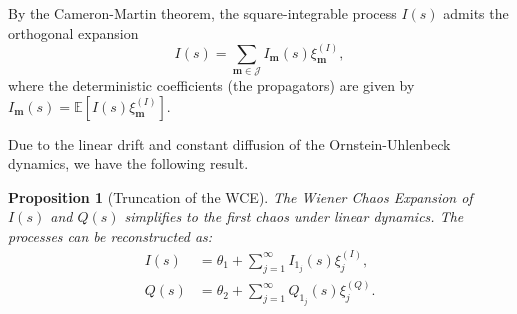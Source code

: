 \documentclass[11pt]{article}
\newtheorem{proposition}{Proposition}
\begin{document}
By the Cameron-Martin theorem, the square-integrable process $I(s)$ admits the orthogonal expansion 
$$
I(s) = \sum_{\mathbf{m} \in \mathcal{J}} I_{\mathbf{m}}(s) \xi_{\mathbf{m}}^{(I)},
$$
where the deterministic coefficients (the propagators) are given by $I_{\mathbf{m}}(s) = \mathbb{E}[I(s)\xi_{\mathbf{m}}^{(I)}]$.

Due to the linear drift and constant diffusion of the Ornstein-Uhlenbeck dynamics, we have the following result.
\begin{proposition}[Truncation of the WCE]\label{prop:markovian_projection}
The Wiener Chaos Expansion of $I(s)$ and $Q(s)$ simplifies to the first chaos under linear dynamics. The processes can be reconstructed as:
\begin{align}
     I(s)& = \theta_1 + \sum_{j=1}^\infty I_{1_j}(s) \xi_j^{(I)}, \\
     Q(s) &= \theta_2 + \sum_{j=1}^\infty Q_{1_j}(s) \xi_j^{(Q)}.
\end{align}
\end{proposition}
\end{document}
